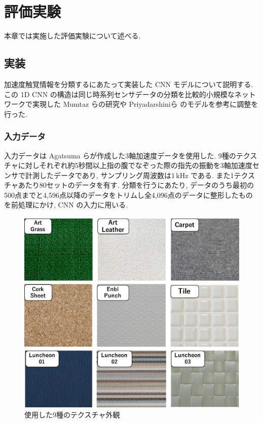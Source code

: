 \chapter{評価実験}
\label{chap:exp}
本章では実施した評価実験について述べる. 
\section{実装}
加速度触覚情報を分類するにあたって実装した CNN モデルについて説明する. 
この 1D CNN の構造は同じ時系列センサデータの分類を比較的小規模なネットワークで実現した Mumtaz らの研究\cite{mumtaz}や Priyadarshiniら\cite{priyadarshini} のモデルを参考に調整を行った. 

\subsection{入力データ}
入力データは Agatsuma ら\cite{agatsuma}が作成した3軸加速度データを使用した. 
9種のテクスチャに対しそれぞれ約5秒間以上指の腹でなぞった際の指先の振動を3軸加速度センサで計測したデータであり, サンプリング周波数は$1 \, \mathrm{kHz}$ である. また1テクスチャあたり80セットのデータを有す. 
分類を行うにあたり, データのうち最初の500点までと4,596点以降のデータをトリムし全4,096点のデータに整形したものを前処理にかけ,  CNN の入力に用いる. 

\begin{figure}[H]
    \begin{center}
    \includegraphics[width=12cm]{eps/textures.pdf}
    \caption{使用した9種のテクスチャ外観}
    \label{fig:texture}
   \end{center}
   \end{figure}

